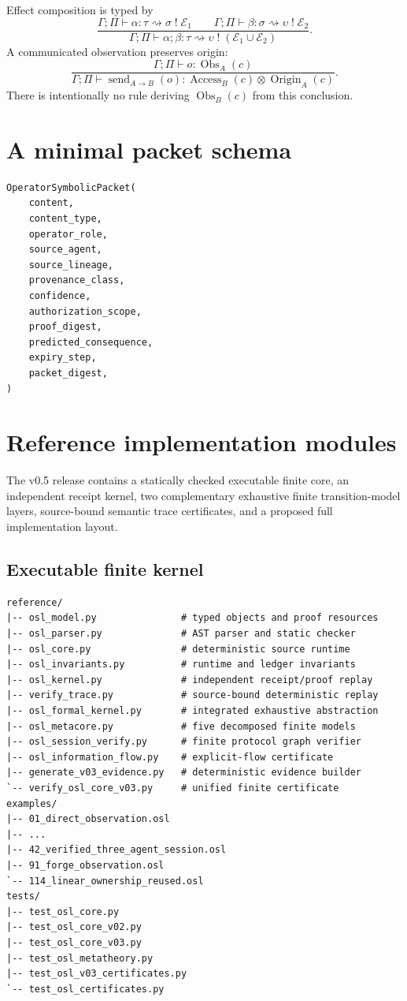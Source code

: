 \documentclass[11pt]{article}
\theoremstyle{definition}
\theoremstyle{remark}
\newcommand{\Access}{\operatorname{Access}}
\newcommand{\Origin}{\operatorname{Origin}}
\newcommand{\Obs}{\operatorname{Obs}}
\begin{document}
Effect composition is typed by
\[
\frac{
\Gamma;\Pi\vdash\alpha:\tau\rightsquigarrow\sigma\;!\;\mathcal E_1
\qquad
\Gamma;\Pi\vdash\beta:\sigma\rightsquigarrow\upsilon\;!\;\mathcal E_2
}{
\Gamma;\Pi\vdash\alpha;\beta:\tau\rightsquigarrow\upsilon\;!\;(\mathcal E_1\cup\mathcal E_2)
}.
\]
A communicated observation preserves origin:
\[
\frac{
\Gamma;\Pi\vdash o:\Obs_A(c)
}{
\Gamma;\Pi\vdash\operatorname{send}_{A\to B}(o):
\Access_B(c)\otimes\Origin_A(c)
}.
\]
There is intentionally no rule deriving \(\Obs_B(c)\) from this conclusion.

\section{A minimal packet schema}

\begin{verbatim}
OperatorSymbolicPacket(
    content,
    content_type,
    operator_role,
    source_agent,
    source_lineage,
    provenance_class,
    confidence,
    authorization_scope,
    proof_digest,
    predicted_consequence,
    expiry_step,
    packet_digest,
)
\end{verbatim}

\section{Reference implementation modules}

The v0.5 release contains a statically checked executable finite core, an independent receipt kernel, two complementary exhaustive finite transition-model layers, source-bound semantic trace certificates, and a proposed full implementation layout.

\subsection{Executable finite kernel}
\begin{verbatim}
reference/
|-- osl_model.py               # typed objects and proof resources
|-- osl_parser.py              # AST parser and static checker
|-- osl_core.py                # deterministic source runtime
|-- osl_invariants.py          # runtime and ledger invariants
|-- osl_kernel.py              # independent receipt/proof replay
|-- verify_trace.py            # source-bound deterministic replay
|-- osl_formal_kernel.py       # integrated exhaustive abstraction
|-- osl_metacore.py            # five decomposed finite models
|-- osl_session_verify.py      # finite protocol graph verifier
|-- osl_information_flow.py    # explicit-flow certificate
|-- generate_v03_evidence.py   # deterministic evidence builder
`-- verify_osl_core_v03.py     # unified finite certificate
examples/
|-- 01_direct_observation.osl
|-- ...
|-- 42_verified_three_agent_session.osl
|-- 91_forge_observation.osl
`-- 114_linear_ownership_reused.osl
tests/
|-- test_osl_core.py
|-- test_osl_core_v02.py
|-- test_osl_core_v03.py
|-- test_osl_metatheory.py
|-- test_osl_v03_certificates.py
`-- test_osl_certificates.py
\end{verbatim}
\end{document}
